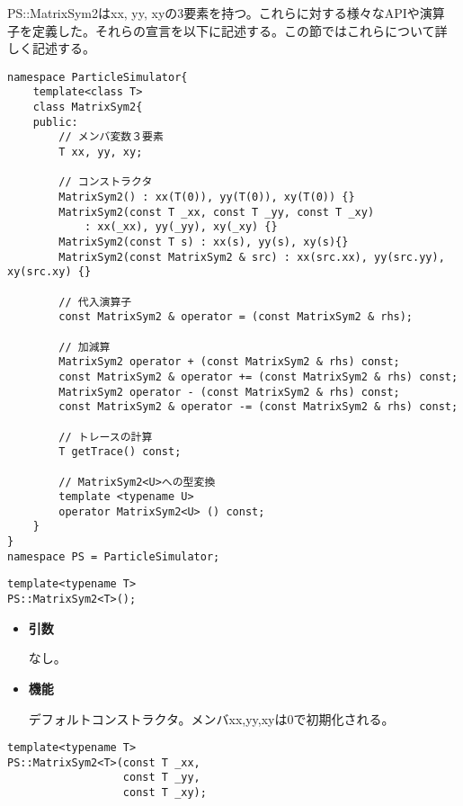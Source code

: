 PS::MatrixSym2はxx, yy, xyの3要素を持つ。これらに対する様々なAPIや演算
子を定義した。それらの宣言を以下に記述する。この節ではこれらについて詳
しく記述する。
\begin{lstlisting}[caption=MatrixSym2]
namespace ParticleSimulator{
    template<class T>
    class MatrixSym2{
    public:
        // メンバ変数３要素
        T xx, yy, xy;

        // コンストラクタ
        MatrixSym2() : xx(T(0)), yy(T(0)), xy(T(0)) {}
        MatrixSym2(const T _xx, const T _yy, const T _xy)
            : xx(_xx), yy(_yy), xy(_xy) {}
        MatrixSym2(const T s) : xx(s), yy(s), xy(s){}
        MatrixSym2(const MatrixSym2 & src) : xx(src.xx), yy(src.yy), xy(src.xy) {}

        // 代入演算子
        const MatrixSym2 & operator = (const MatrixSym2 & rhs);

        // 加減算
        MatrixSym2 operator + (const MatrixSym2 & rhs) const;
        const MatrixSym2 & operator += (const MatrixSym2 & rhs) const;
        MatrixSym2 operator - (const MatrixSym2 & rhs) const;
        const MatrixSym2 & operator -= (const MatrixSym2 & rhs) const;

        // トレースの計算
        T getTrace() const;

        // MatrixSym2<U>への型変換
        template <typename U>
        operator MatrixSym2<U> () const;
    }
}
namespace PS = ParticleSimulator;
\end{lstlisting}


\begin{screen}
\begin{verbatim}
template<typename T>
PS::MatrixSym2<T>();
\end{verbatim}
\end{screen}

\begin{itemize}

\item{{\bf 引数}}

なし。

\item{{\bf 機能}}

デフォルトコンストラクタ。メンバxx,yy,xyは0で初期化される。

\end{itemize}

\begin{screen}
\begin{verbatim}
template<typename T>
PS::MatrixSym2<T>(const T _xx,
                  const T _yy,
                  const T _xy);
\end{verbatim}
\end{screen}

